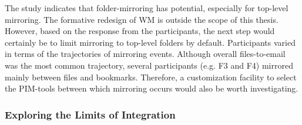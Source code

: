 The study indicates that folder-mirroring has potential, especially for top-level mirroring.
The formative redesign of WM is outside the scope of this thesis.  However, based on the response from the participants, the next step would certainly be to limit mirroring to top-level folders by default.  Participants varied in terms of the trajectories of mirroring events. Although overall files-to-email was the most common trajectory, several participants (e.g. F3 and F4) mirrored mainly between files and bookmarks.  Therefore, a customization facility to select the PIM-tools between which mirroring occurs would also be worth investigating. 



\subsubsection{Exploring the Limits of Integration}


